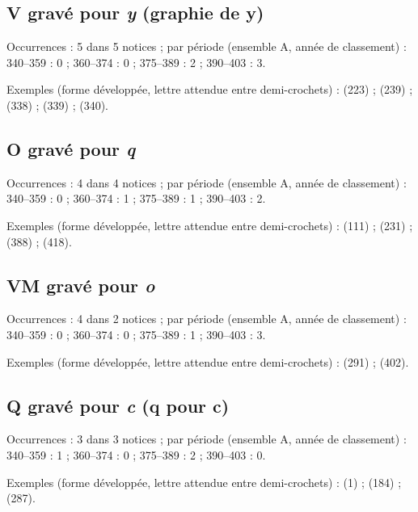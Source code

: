\subsection*{V gravé pour \textit{y} (graphie de y)}
\noindent Occurrences : 5 dans 5 notices ; par période (ensemble A, année de classement) : 340–359 : 0 ; 360–374 : 0 ; 375–389 : 2 ; 390–403 : 3.\par
\noindent Exemples (forme développée, lettre attendue entre demi-crochets) :  (223) ;  (239) ;  (338) ;  (339) ;  (340).\par
{}\par\medskip
\subsection*{O gravé pour \textit{q}}
\noindent Occurrences : 4 dans 4 notices ; par période (ensemble A, année de classement) : 340–359 : 0 ; 360–374 : 1 ; 375–389 : 1 ; 390–403 : 2.\par
\noindent Exemples (forme développée, lettre attendue entre demi-crochets) :  (111) ;  (231) ;  (388) ;  (418).\par
{}\par\medskip
\subsection*{VM gravé pour \textit{o}}
\noindent Occurrences : 4 dans 2 notices ; par période (ensemble A, année de classement) : 340–359 : 0 ; 360–374 : 0 ; 375–389 : 1 ; 390–403 : 3.\par
\noindent Exemples (forme développée, lettre attendue entre demi-crochets) :  (291) ;  (402).\par
{}\par\medskip
\subsection*{Q gravé pour \textit{c} (q pour c)}
\noindent Occurrences : 3 dans 3 notices ; par période (ensemble A, année de classement) : 340–359 : 1 ; 360–374 : 0 ; 375–389 : 2 ; 390–403 : 0.\par
\noindent Exemples (forme développée, lettre attendue entre demi-crochets) :  (1) ;  (184) ;  (287).\par
{}\par\medskip
